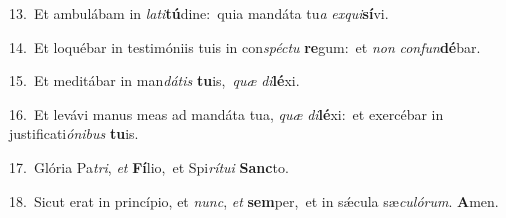 {\numbfont\textcolor{\numbcolor}{13.}}~Et ambulábam in \textit{la}\-\textit{ti}\textbf{tú}dine:~\star quia mandáta tu\textit{a} \textit{ex}\-\textit{qui}\textbf{sí}vi.\par
{\numbfont\textcolor{\numbcolor}{14.}}~Et loquébar in testimóniis tuis in con\-\textit{spéc}\-\textit{tu} \textbf{re}\-gum:~\star et \textit{non} \textit{con}\-\textit{fun}\textbf{dé}bar.\par
{\numbfont\textcolor{\numbcolor}{15.}}~Et meditábar in man\-\textit{dá}\-\textit{tis} \textbf{tu}\-is,~\star \textit{quæ} \textit{di}\-\textbf{lé}xi.\par
{\numbfont\textcolor{\numbcolor}{16.}}~Et levávi manus meas ad mandáta tua, \textit{quæ} \textit{di}\-\textbf{lé}xi:~\star et exercébar in justificati\-\textit{ó}\-\textit{ni}\textit{bus} \textbf{tu}\-is.\par
{\numbfont\textcolor{\numbcolor}{17.}}~Glória Pa\-\textit{tri}\-, \textit{et} \textbf{Fí}\-lio,~\star et Spi\-\textit{rí}\-\textit{tu}\textit{i} \textbf{Sanc}\-to.\par
{\numbfont\textcolor{\numbcolor}{18.}}~Sicut erat in princípio, et \textit{nunc}\-, \textit{et} \textbf{sem}\-per,~\star et in sǽcula sæ\-\textit{cu}\-\textit{ló}\textit{rum}. \textbf{A}\-men.\par
